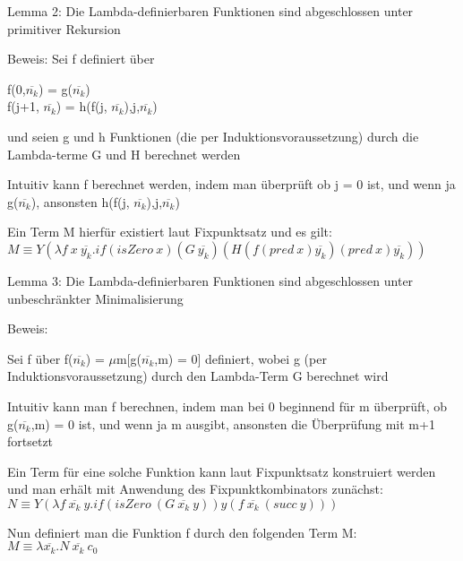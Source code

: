 \documentclass[10pt]{article}
\begin{document}
\begin{itemize*}
  \item  \color{blue} Lemma 2: Die Lambda-definierbaren Funktionen sind abgeschlossen unter primitiver Rekursion \color{black}
  \item Beweis: Sei f definiert über
  \begin{center}
    f(0,$\overline{n_k}$) = g($\overline{n_k}$)\\
    f(j+1, $\overline{n_k}$) = h(f(j, $\overline{n_k}$),j,$\overline{n_k}$)
  \end{center}
  und seien g und h Funktionen (die per Induktionsvoraussetzung) durch die Lambda-terme G und H berechnet werden
  \begin{itemize*}
    \item Intuitiv kann f berechnet werden, indem man überprüft ob j = 0 ist, und wenn ja g($\overline{n_k}$), ansonsten h(f(j, $\overline{n_k}$),j,$\overline{n_k}$)
    \item Ein Term M hierfür existiert laut Fixpunktsatz und es gilt:
    $M \equiv Y (\lambda f\:x\: \overline{y_k}.if(isZero \: x)(G\:\overline{y_k})(H(f(pred\: x)\overline{y_k})(pred \: x)\overline{y_k}))$
  \end{itemize*}
\end{itemize*}

\begin{itemize*}
  \item \color{blue} Lemma 3: Die Lambda-definierbaren Funktionen sind abgeschlossen unter unbeschränkter Minimalisierung \color{black}
  \item Beweis:
  \begin{itemize*}
    \item Sei f über f($\overline{n_k}$) = $\mu$m[g($\overline{n_k}$,m) = 0] definiert, wobei g (per Induktionsvoraussetzung) durch den Lambda-Term G berechnet wird
    \item Intuitiv kann man f berechnen, indem man bei 0 beginnend für m überprüft, ob g($\overline{n_k}$,m) = 0 ist, und wenn ja m ausgibt, ansonsten die Überprüfung mit m+1 fortsetzt
    \item Ein Term für eine solche Funktion kann laut Fixpunktsatz konstruiert werden und man erhält mit Anwendung des Fixpunktkombinators zunächst: \\
    $N \equiv Y (\lambda f \: \overline{x_k} \: y. if(isZero \: (G \: \overline{x_k} \: y))y(f\:\overline{x_k}\:(succ \: y)))$
    \item Nun definiert man die Funktion f durch den folgenden Term M: \\
    $M \equiv \lambda \overline{x_k}.N \: \overline{x_k} \: c_0$
  \end{itemize*}
\end{itemize*}
\end{document}
